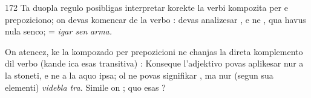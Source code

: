\begin{VUpage}[176]{172}
Ta duopla regulo posibligas interpretar korekte la verbi\nl
kompozita per  e prepoziciono; on devas komencar de\nl
la verbo  :  devas analizesar , e ne\nl
{}, qua havus nula senco;  = \textit{igar sen}\cc
\textit{arma.}

On atencez, ke la kompozado per prepozicioni ne chanjas\nl
la direta komplemento dil verbo (kande ica esas transitiva) :\nl
{}\nl
{} Konseque l'adjektivo  povas\nl
aplikesar nur a la stoneti, e ne a la aquo ipsa; ol ne povas\nl
signifikar , ma nur (segun sua elementi) \textit{videbla tra.}\nl
Simile on ; quo esas ?\parplein
\end{VUpage}

